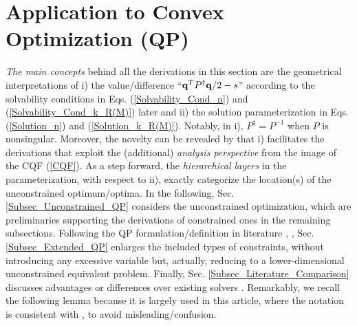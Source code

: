 \documentclass{imaman}
\newcommand{\bfq}{{\bf q}}
\numberwithin{equation}{section}
\begin{document}
\section{Application to Convex Optimization (QP)}
\label{Sec_Convex_Optimization}
\textit{The main concepts} behind all the derivations in this section are the geometrical interpretations of i) the value/difference ``$\bfq^TP^\dagger\bfq/2-s$'' according to the solvability conditions in Eqs. (\ref{Solvability_Cond_n}) and (\ref{Solvability_Cond_k_R(M)}) later and ii) the solution parameterization in Eqs. (\ref{Solution_n}) and (\ref{Solution_k_R(M)}). Notably, in i), $P^\dagger=P^{-1}$ when $P$ is nonsingular. Moreover, the novelty can be revealed by that i) facilitates the derivations that exploit the (additional) \textit{analysis perspective} from the image of the CQF (\ref{CQF}). As a step forward, the \textit{hierarchical layers} in the parameterization, with respect to ii), exactly categorize the location(s) of the unconstrained optimum/optima. In the following, Sec. \ref{Subsec_Unconstrained_QP} considers the unconstrained optimization, which are preliminaries supporting the derivations of constrained ones in the remaining subsections. Following the QP formulation/definition in literature \cite{BoVa:04}, \cite{Lu(Ye):03(16)}, Sec. \ref{Subsec_Extended_QP} enlarges the included types of constraints, without introducing any excessive variable but, actually, reducing to a lower-dimensional unconstrained equivalent problem. Finally, Sec. \ref{Subsec_Literature_Comparison} discusses advantages or differences over existing solvers \cite{NoWr:06}. Remarkably, we recall the following lemma because it is largely used in this article, where the notation is consistent with \cite{LiLiHs:20}, \cite{LiLiHs:draft} to avoid misleading/confusion.
\end{document}
